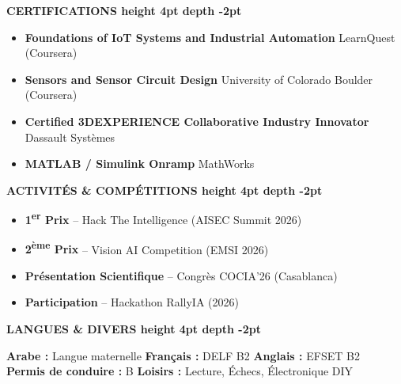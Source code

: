 \documentclass[10pt,a4paper]{altacv}
\renewcommand{\cvsection}[2][]{%
  \medskip%
  {\color{heading}\LARGE\bfseries #2 \hspace{0.2em}\leaders\vrule height 4pt depth -2pt\hfill\mbox{}}\par\smallskip
}
\begin{document}
\cvsection{CERTIFICATIONS}
\begin{itemize}[leftmargin=*, label=\textbullet, itemsep=2pt]
  \item \textbf{Foundations of IoT Systems and Industrial Automation} \hfill {\color{emphasis}LearnQuest (Coursera)}
  \item \textbf{Sensors and Sensor Circuit Design} \hfill {\color{emphasis}University of Colorado Boulder (Coursera)}
  \item \textbf{Certified 3DEXPERIENCE Collaborative Industry Innovator} \hfill {\color{emphasis}Dassault Systèmes}
  \item \textbf{MATLAB / Simulink Onramp} \hfill {\color{emphasis}MathWorks}
\end{itemize}

\cvsection{ACTIVITÉS \& COMPÉTITIONS}
\noindent\begin{minipage}[t]{0.49\linewidth}\raggedright
\begin{itemize}[leftmargin=*, label=\textbullet, itemsep=2pt]
  \item \textbf{1\textsuperscript{er} Prix} -- Hack The Intelligence (AISEC Summit 2026)
  \item \textbf{2\textsuperscript{ème} Prix} -- Vision AI Competition (EMSI 2026)
\end{itemize}
\end{minipage}\hfill
\begin{minipage}[t]{0.49\linewidth}\raggedright
\begin{itemize}[leftmargin=*, label=\textbullet, itemsep=2pt]
  \item \textbf{Présentation Scientifique} -- Congrès COCIA'26 (Casablanca)
  \item \textbf{Participation} -- Hackathon RallyIA (2026)
\end{itemize}
\end{minipage}


\cvsection{LANGUES \& DIVERS}
\textbf{Arabe :} Langue maternelle \hfill \textbf{Français :} DELF B2 \hfill \textbf{Anglais :} EFSET B2\\[2pt]
\textbf{Permis de conduire :} B \hfill \textbf{Loisirs :} Lecture, Échecs, Électronique DIY
\end{document}
